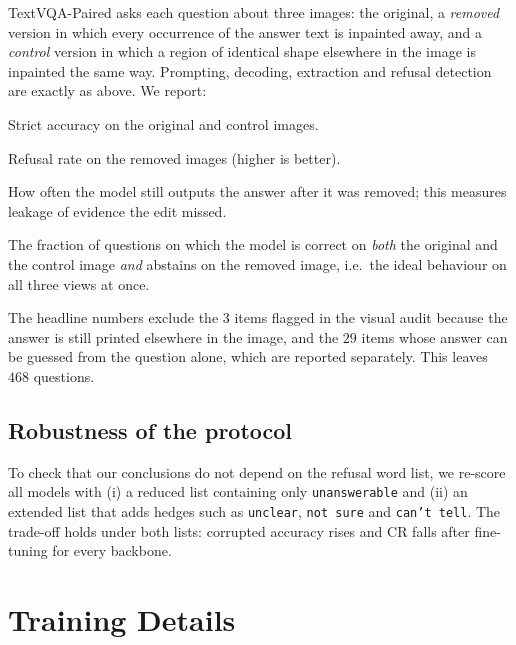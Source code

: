 TextVQA-Paired asks each question about
three images: the original, a \emph{removed} version in which every occurrence of the
answer text is inpainted away, and a \emph{control} version in which a region of
identical shape elsewhere in the image is inpainted the same way. Prompting, decoding,
extraction and refusal detection are exactly as above. We report:
\begin{description}\itemsep2pt
  \item[Orig.\ / control acc.] Strict accuracy on the original and control images.
  \item[Removed abstention.] Refusal rate on the removed images (higher is better).
  \item[Removed still correct.] How often the model still outputs the answer after it was
        removed; this measures leakage of evidence the edit missed.
  \item[Paired consistency.] The fraction of questions on which the model is correct on
        \emph{both} the original and the control image \emph{and} abstains on the
        removed image, i.e.\ the ideal behaviour on all three views at once.
\end{description}
The headline numbers exclude the $3$ items flagged in the visual audit because the
answer is still printed elsewhere in the image, and the $29$ items whose answer can be
guessed from the question alone, which are reported separately. This leaves $468$
questions.

\subsection{Robustness of the protocol}
\label{sec:supp_eval_sensitivity}

To check that our conclusions do not depend on the refusal word list, we re-score all
models with (i) a reduced list containing only \texttt{unanswerable} and (ii) an extended
list that adds hedges such as \texttt{unclear}, \texttt{not sure} and \texttt{can't tell}.
The trade-off holds under both lists: corrupted accuracy rises and CR falls after
fine-tuning for every backbone. %

\section{Training Details}
\label{sec:supp_train}

